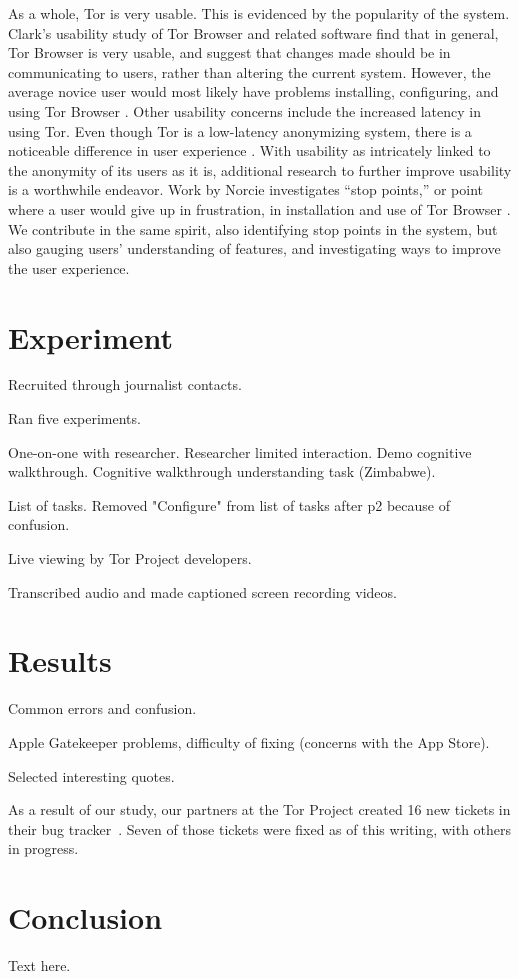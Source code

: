 \documentclass{sig-alternate-hotpets15}
\begin{document}
As a whole, Tor is very usable. This is evidenced by the popularity of the system. Clark's usability study of Tor Browser and related software find that in general, Tor Browser is very usable, and suggest that changes made should be in communicating to users, rather than altering the current system. However, the average novice user would most likely have problems installing, configuring, and using Tor Browser \cite{clark2007usability}. Other usability concerns include the increased latency in using Tor. Even though Tor is a low-latency anonymizing system, there is a noticeable difference in user experience \cite{fabian2010privately}. With usability as intricately linked to the anonymity of its users as it is, additional research to further improve usability is a worthwhile endeavor. Work by Norcie investigates ``stop points,'' or point where a user would give up in frustration, in installation and use of Tor Browser \cite{norcie2012eliminating}. We contribute in the same spirit, also identifying stop points in the system, but also gauging users' understanding of features, and investigating ways to improve the user experience. 

\section{Experiment}

Recruited through journalist contacts.

Ran five experiments.

One-on-one with researcher.
Researcher limited interaction.
Demo cognitive walkthrough.
Cognitive walkthrough understanding task (Zimbabwe).

List of tasks.
Removed "Configure" from list of tasks after p2 because of confusion.

Live viewing by Tor Project developers.

Transcribed audio and made captioned screen recording videos.


\section{Results}

Common errors and confusion.

Apple Gatekeeper problems,
difficulty of fixing (concerns with the App Store).

Selected interesting quotes.

As a result of our study,
our partners at the Tor Project created 16 new tickets in their bug tracker~\cite{uxsprint2015-tickets}.
Seven of those tickets were fixed as of this writing,
with others in progress.

\section{Conclusion}

Text here.


 
\end{document}
